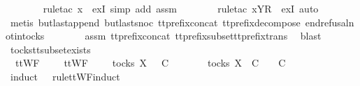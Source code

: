 \ \ \ \ \ \ \isamarkupfalse%
\ {\isacharparenleft}rule{\isacharunderscore}tac\ x{\isacharequal}{\isachardoublequoteopen}{\isasymrho}{\isacharprime}{\isachardoublequoteclose}\ \ exI{\isacharcomma}\ simp\ add{\isacharcolon}\ assm{}{\isacharparenright}\isanewline
\ \ \ \ \ \ \isamarkupfalse%
\ {\isacharparenleft}rule{\isacharunderscore}tac\ x{\isacharequal}{\isachardoublequoteopen}{\isacharbrackleft}{\isacharbrackleft}Y{\isacharbrackright}\isactrlsub R{\isacharbrackright}{\isachardoublequoteclose}\ \ exI{\isacharcomma}\ auto{\isacharparenright}\isanewline
\ \ \ \ \ \ \isamarkupfalse%
\ {\isacharparenleft}metis\ butlast{\isacharunderscore}append\ butlast{\isacharunderscore}snoc\ tt{\isacharunderscore}prefix{\isacharunderscore}concat\ tt{\isacharunderscore}prefix{\isacharunderscore}decompose\ end{\isacharunderscore}refusal{\isacharunderscore}notin{\isacharunderscore}tocks{\isacharparenright}\isanewline
\ \ \ \ \ \ \isamarkupfalse%
\ assm{}\ tt{\isacharunderscore}prefix{\isacharunderscore}concat\ tt{\isacharunderscore}prefix{\isacharunderscore}subset{\isacharunderscore}tt{\isacharunderscore}prefix{\isacharunderscore}trans\ \isamarkupfalse%
\ blast\isanewline
\ \ \isamarkupfalse%
\isanewline
{}\isamarkupfalse%
%
\endisatagproof
{\isafoldproof}%
%
\isadelimproof
\isanewline
%
\endisadelimproof
\isanewline
{}\isamarkupfalse%
\ tocks{\isacharunderscore}tt{\isacharunderscore}subset{\isacharunderscore}exists{\isacharcolon}\isanewline
\ \ {\isachardoublequoteopen}ttWF\ {\isacharparenleft}{\isasymrho}\ {\isacharat}\ {\isasymsigma}{\isacharparenright}\ {\isasymLongrightarrow}\ ttWF\ {\isasymsigma}{\isacharprime}\ {\isasymLongrightarrow}\ {\isasymrho}\ {\isasymin}\ tocks\ X\ {\isasymand}\ {\isasymsigma}{\isacharprime}\ {\isasymsubseteq}\isactrlsub C\ {\isasymrho}\ {\isacharat}\ {\isasymsigma}\ {\isasymLongrightarrow}\ {\isasymexists}\ {\isasymrho}{\isacharprime}\ {\isasymin}\ tocks\ X{\isachardot}\ {\isasymrho}{\isacharprime}\ {\isasymsubseteq}\isactrlsub C\ {\isasymrho}\ {\isasymand}\ {\isasymrho}{\isacharprime}\ {\isasymle}\isactrlsub C\ {\isasymsigma}{\isacharprime}{\isachardoublequoteclose}\isanewline
%
\isadelimproof
\ \ %
\endisadelimproof
%
\isatagproof
{}\isamarkupfalse%
\ {\isacharparenleft}induct\ {\isasymsigma}{\isacharprime}\ {\isasymrho}\ rule{\isacharcolon}ttWF{}{\isachardot}induct{\isacharparenright}\isanewline
\ \ \isamarkupfalse%
